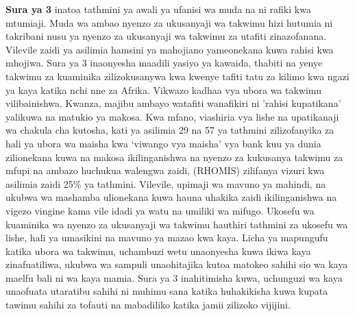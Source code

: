 \textbf{Sura ya 3} inatoa tathmini ya awali ya ufanisi wa muda na ni rafiki kwa mtumiaji. Muda wa ambao nyenzo za ukusanyaji wa takwimu hizi hutumia ni takribani nusu ya nyenzo za ukusanyaji wa takwimu za utafiti zinazofanana. Vilevile zaidi ya asilimia hamsini ya mahojiano yameonekana kuwa rahisi kwa mhojiwa. Sura ya 3 inaonyesha maadili yasiyo ya kawaida, thabiti na yenye takwimu za kuaminika zilizokusanywa kwa kwenye tafiti tatu za kilimo kwa ngazi ya kaya katika nchi nne za Afrika. Vikwazo kadhaa vya ubora wa takwimu vilibainishwa. Kwanza, majibu ambayo watafiti wanafikiri ni 'rahisi kupatikana' yalikuwa na matukio ya makosa. Kwa mfano, viashiria vya lishe na upatikanaji wa chakula cha kutosha, kati ya asilimia 29 na 57 ya tathmini zilizofanyika za hali ya ubora wa maisha kwa `viwango vya maisha' vya bank kuu ya dunia zilionekana kuwa na makosa ikilinganishwa na nyenzo za kukusanya takwimu za mfupi na ambazo huchukua walengwa zaidi, (RHOMIS) zilifanya vizuri kwa asilimia zaidi 25\% ya tathmini.
Vilevile, upimaji wa mavuno ya mahindi, na ukubwa wa mashamba ulionekana kuwa hauna uhakika zaidi ikilinganishwa na vigezo vingine kama vile idadi ya watu na umiliki wa mifugo. Ukosefu wa kuaminika wa nyenzo za ukusanyaji wa takwimu hauthiri tathmini za ukosefu wa lishe, hali ya umasikini na mavuno ya mazao kwa kaya. Licha ya mapungufu katika ubora wa takwimu, uchambuzi wetu unaonyesha kuwa ikiwa kaya zinafuatiliwa, ukubwa wa sampuli unaohitajika kutoa matokeo sahihi sio wa kaya maelfu bali ni wa kaya mamia. Sura ya 3 inahitimisha kuwa, uchunguzi wa kaya unaofuata utaratibu sahihi ni muhimu sana katika huhakikisha kuwa kupata tawimu sahihi za tofauti na mabadiliko katika jamii zilizoko vijijini.

